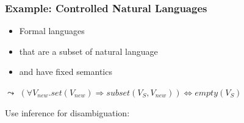 \begin{frame}
    \frametitle{Example: Controlled Natural Languages}
    \begin{itemize}
        \item Formal languages
        \item that are a subset of natural language
        \item and have fixed semantics
    \end{itemize}

    \vspace{1em}

    $\leadsto$ {\color{logicfont}$(\forall V_{new}. set(V_{new}) \Rightarrow subset(V_S, V_{new})) \Leftrightarrow empty(V_S)$}

    \pause
    \vspace{1.5em}
    Use inference for disambiguation:

    \vspace{1em}
     
\end{frame}

